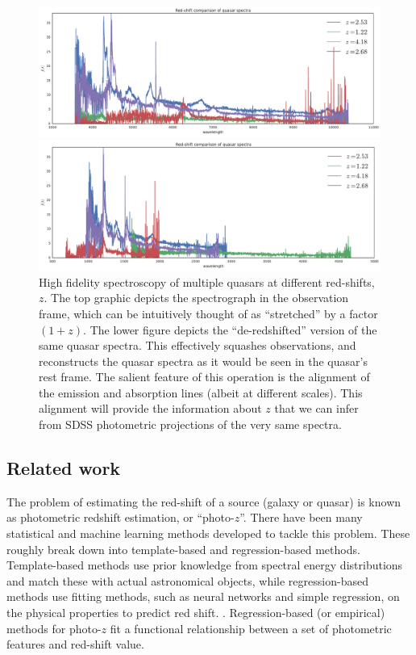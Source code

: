 \documentclass{article}
\begin{document}
\begin{figure}[ht]
\vskip 0.2in
\begin{center}
\centerline{\includegraphics[width=2\columnwidth]{../figs/quasar_redshift_obs_frame}}
\centerline{\includegraphics[width=2\columnwidth]{../figs/quasar_redshift_rest_frame}}
\caption{High fidelity spectroscopy of multiple quasars at different red-shifts, $z$.  The top graphic depicts the spectrograph in the observation frame, which can be intuitively thought of as ``stretched'' by a factor $(1+z)$.  The lower figure depicts the ``de-redshifted'' version of the same quasar spectra.  This effectively squashes observations, and reconstructs the quasar spectra as it would be seen in the quasar's rest frame.  The salient feature of this operation is the alignment of the emission and absorption lines (albeit at different scales).  This alignment will provide the information about $z$ that we can infer from SDSS photometric projections of the very same spectra.}
\label{fig:frames}
\end{center}
\vskip -0.2in
\end{figure} 

\subsection{Related work}
The problem of estimating the red-shift of a source (galaxy or quasar) is known as photometric redshift estimation, or
``photo-$z$''.  There have been many statistical and machine learning methods developed to tackle this problem. These roughly break down into template-based and regression-based methods. Template-based methods use prior knowledge from spectral energy distributions
and match these with actual astronomical objects, while regression-based methods use fitting methods, such as neural networks and
simple regression, on the physical properties to predict red shift. \cite{walcher2011fitting}.  Regression-based (or empirical) methods for photo-$z$ fit a functional relationship between a set of photometric features and red-shift value.  
\end{document}
